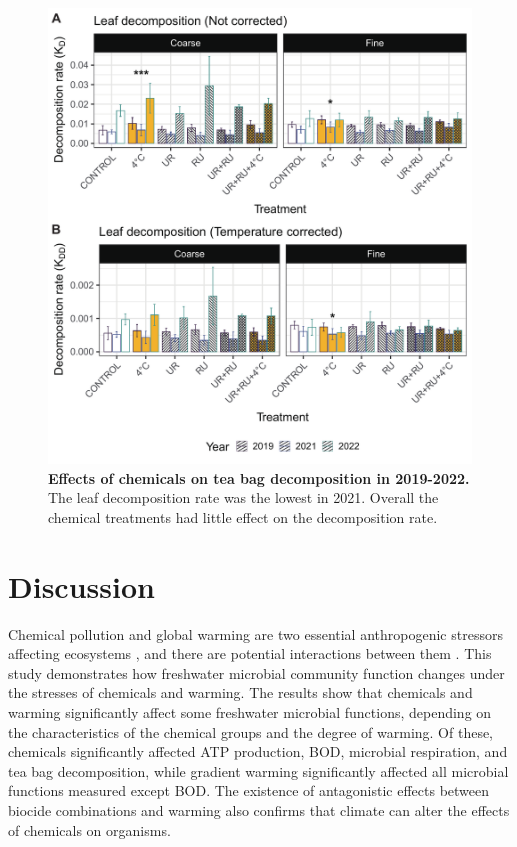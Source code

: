 \documentclass[11pt, a4paper]{article}
\begin{document}
\begin{spacing}{1.5}
\begin{figure}[H]
    \centering
    \includegraphics[scale=0.55]{./Figures/LD3Year_bar}
    \caption{\textbf{Effects of chemicals on tea bag decomposition in 2019-2022.} The leaf decomposition rate was the lowest in 2021. Overall the chemical treatments had little effect on the decomposition rate.}
    \label{fig:LDTreat}
\end{figure}


\section{Discussion}

Chemical pollution and global warming are two essential anthropogenic stressors affecting ecosystems \citep{bronmark2002environmental}, and there are potential interactions between them \citep{hooper2013interactions}. This study demonstrates how freshwater microbial community function changes under the stresses of chemicals and warming. The results show that chemicals and warming significantly affect some freshwater microbial functions, depending on the characteristics of the chemical groups and the degree of warming. Of these, chemicals significantly affected ATP production, BOD, microbial respiration, and tea bag decomposition, while gradient warming significantly affected all microbial functions measured except BOD. The existence of antagonistic effects between biocide combinations and warming also confirms that climate can alter the effects of chemicals on organisms.


\end{spacing}
\end{document}
